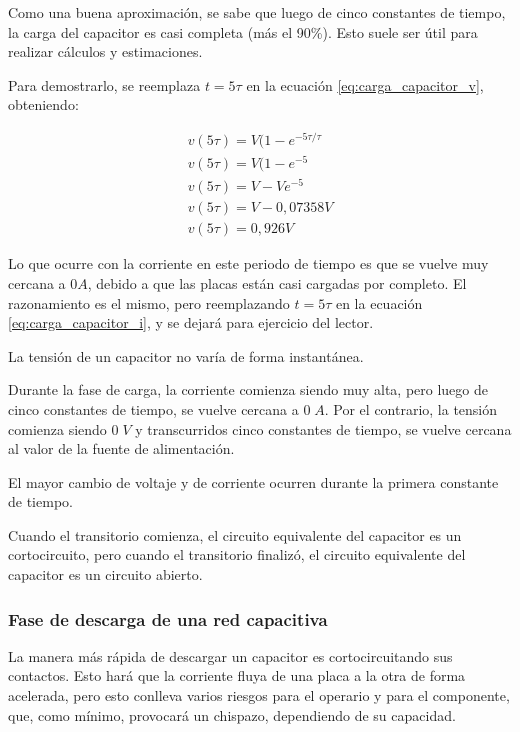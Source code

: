 Como una buena aproximación, se sabe que luego de cinco constantes de tiempo, la carga del capacitor es casi completa (más el 90\%). Esto suele ser útil para realizar cálculos y estimaciones.

Para demostrarlo, se reemplaza $t=5\tau$ en la ecuación \ref{eq:carga_capacitor_v}, obteniendo:

\begin{eqnarray*}
	v(5\tau)=V(1-e^{-5\tau / \tau} \\
	v(5\tau)=V(1-e^{-5} \\
	v(5\tau)=V-Ve^{-5} \\
	v(5\tau)=V-0,07358V  \\
	v(5\tau)=0,926V
\end{eqnarray*}

Lo que ocurre con la corriente en este periodo de tiempo es que se vuelve muy cercana a $0 A$, debido a que las placas están casi cargadas por completo. El razonamiento es el mismo, pero reemplazando $t=5\tau$ en la ecuación \ref{eq:carga_capacitor_i}, y se dejará para ejercicio del lector.

\begin{conclusiones}
	La tensión de un capacitor no varía de forma instantánea.
		
	Durante la fase de carga, la corriente comienza siendo muy alta, pero luego de cinco constantes de tiempo, se vuelve cercana a $0\; A$. Por el contrario, la tensión comienza siendo $0\; V$ y transcurridos cinco constantes de tiempo, se vuelve cercana al valor de la fuente de alimentación.
	
	El mayor cambio de voltaje y de corriente ocurren durante la primera constante de tiempo.
	
	Cuando el transitorio comienza, el circuito equivalente del capacitor es un cortocircuito, pero cuando el transitorio finalizó, el circuito equivalente del capacitor es un circuito abierto.
\end{conclusiones}
\subsubsection{Fase de descarga de una red capacitiva}
La manera más rápida de descargar un capacitor es cortocircuitando sus contactos. Esto hará que la corriente fluya de una placa a la otra de forma acelerada, pero esto conlleva varios riesgos para el operario y para el componente, que, como mínimo, provocará un chispazo, dependiendo de su capacidad.

